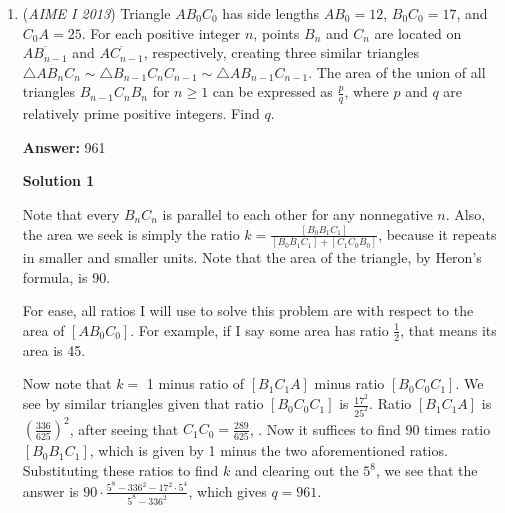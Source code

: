 \begin{enumerate}
 



\textbf{Solution 9 (I'm not sure if this has been posted before)}

Let $F$ be the point on $RP$. Drop the perpendicular $FD$, and notice the length of this is $\sqrt{3}$. Consider the $45-45-90$ triangle $\triangle FDR$. The area is clearly $\frac{3}{2}$. This also takes away a sixth of the original hexagon, so we add $\frac{5}{6} \cdot \frac{1^2 \sqrt{3}}{4}$. The equilateral triangle $\triangle BCQ$ has area $\frac{3}{4}$. Finally, the upper triangle, $\triangle PAF$, has $1$ side facing the $75^{\circ}$ angle, so consequently by law of sines we obtain the side opposing the $45$ degree angle has side length $\sqrt{3} - 1$ (recall that $\sin 75^{\circ} = \frac{\sqrt{6} + \sqrt{2}}{4}$). Then, we have $\frac{1}{2} (\sqrt{3} - 1)(1) \sin(60^{\circ}) = \frac{3-\sqrt{3}}{4}$. Adding the four areas together, we obtain $\frac{9 + 5\sqrt{3}}{4}$. (Don't forget that the area of the 45-45-90 triangle is not in fact $3$, unless you want a final answer of $27$ instead of the actual $\boxed{21}$).

 


	\item (\textit{AIME I 2013}) Triangle $AB_0C_0$ has side lengths $AB_0 = 12$, $B_0C_0 = 17$, and $C_0A = 25$. For each positive integer $n$, points $B_n$ and $C_n$ are located on $\overline{AB_{n-1}}$ and $\overline{AC_{n-1}}$, respectively, creating three similar triangles $\triangle AB_nC_n \sim \triangle B_{n-1}C_nC_{n-1} \sim \triangle AB_{n-1}C_{n-1}$. The area of the union of all triangles $B_{n-1}C_nB_n$ for $n\geq1$ can be expressed as $\frac pq$, where $p$ and $q$ are relatively prime positive integers. Find $q$.


 
 \textbf{Answer: }961



\textbf{Solution 1}

Note that every $B_nC_n$ is parallel to each other for any nonnegative $n$. Also, the area we seek is simply the ratio $k=\frac{[B_0B_1C_1]}{[B_0B_1C_1]+[C_1C_0B_0]}$, because it repeats in smaller and smaller units. Note that the area of the triangle, by Heron's formula, is 90.

 For ease, all ratios I will use to solve this problem are with respect to the area of $[AB_0C_0]$. For example, if I say some area has ratio $\frac{1}{2}$, that means its area is 45.

 Now note that $k=$ 1 minus ratio of $[B_1C_1A]$ minus ratio $[B_0C_0C_1]$. We see by similar triangles given that ratio $[B_0C_0C_1]$ is $\frac{17^2}{25^2}$. Ratio $[B_1C_1A]$ is $(\frac{336}{625})^2$, after seeing that $C_1C_0 = \frac{289}{625}$, . Now it suffices to find 90 times ratio $[B_0B_1C_1]$, which is given by 1 minus the two aforementioned ratios. Substituting these ratios to find $k$ and clearing out the $5^8$, we see that the answer is $90\cdot \frac{5^8-336^2-17^2\cdot 5^4}{5^8-336^2}$, which gives $q= \boxed{961}$.


\end{enumerate}

